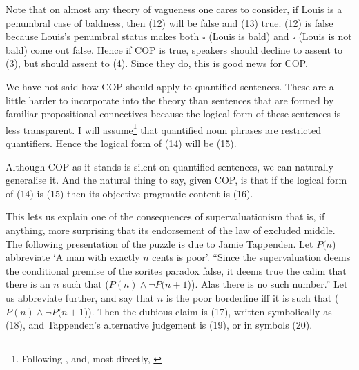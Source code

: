 \noindent Note that on almost any theory of vagueness one cares to consider, if Louis is a penumbral case of baldness, then (12) will be false and (13) true. (12) is false because Louis's penumbral status makes both \(\square\) (Louis is bald) and \(\square\) (Louis is not bald) come out false. Hence if COP is true, speakers should decline to assent to (3), but should assent to (4). Since they do, this is good news for COP.

We have not said how COP should apply to quantified sentences. These are a little harder to incorporate into the theory than sentences that are formed by familiar propositional connectives because the logical form of these sentences is less transparent. I will assume\footnote{Following \citet{Barwise1981}, \citet{Higginbotham1981} and, most directly, \citet{Neale1990}} that quantified noun phrases are restricted quantifiers. Hence the logical form of (14) will be (15).


\noindent Although COP as it stands is silent on quantified sentences, we can naturally generalise it. And the natural thing to say, given COP, is that if the logical form of (14) is (15) then its objective pragmatic content is (16). 


\noindent This lets us explain one of the consequences of supervaluationism that is, if anything, more surprising that its endorsement of the law of excluded middle. The following presentation of the puzzle is due to Jamie Tappenden. Let \(P(n\)) abbreviate `A man with exactly \(n\) cents is poor'. ``Since the supervaluation deems the conditional premise of the sorites paradox false, it deems true the calim that there is an \(n\) such that (\(P(n) \wedge \neg P(n+1\))). Alas there is no such number.'' \citep[564]{Tappenden1993} Let us abbreviate further, and say that \(n\) is the poor borderline iff it is such that (\(P(n) \wedge \neg P(n+1\))). Then the dubious claim is (17), written symbolically as (18), and Tappenden's alternative judgement is (19), or in symbols (20).


